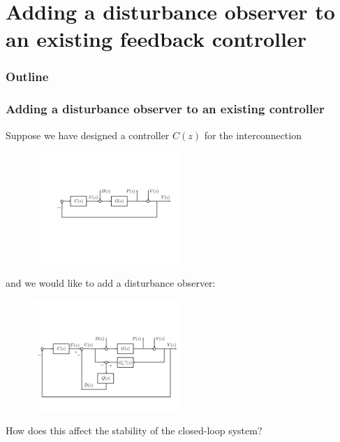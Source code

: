 \section{Adding a disturbance observer to an existing feedback controller}
\begin{frame}
    \frametitle{Outline}
    \tableofcontents[currentsection]
\end{frame}

\begin{frame}
    \frametitle{Adding a disturbance observer to an existing controller}

    Suppose we have designed a controller $C(z)$ for the interconnection
    \begin{figure}
        \includegraphics[width=0.5\textwidth]{Disturbance_Observer_multi1}
    \end{figure}
    and we would like to add a disturbance observer:
    \begin{figure}
        \includegraphics[width=0.5\textwidth]{Disturbance_Observer_multi2}
    \end{figure}
    \pause
    How does this affect the stability of the closed-loop system?

\end{frame}

